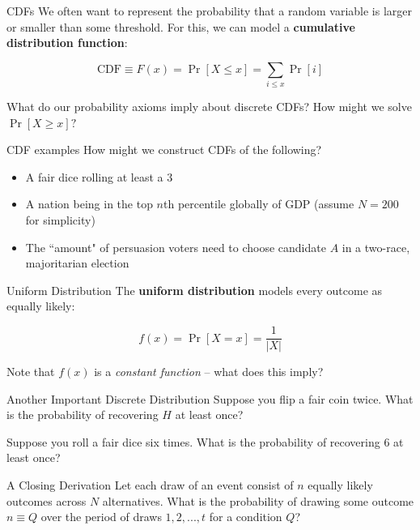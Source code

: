 \documentclass[10pt]{beamer}
\begin{document}
\begin{frame}{CDFs}
    We often want to represent the probability that a random variable is larger or smaller than some threshold. For this, we can model a \textbf{cumulative distribution function}:

    \[\text{CDF} \equiv F(x) = \Pr[X \leq x] = \sum_{i \leq x} \Pr[i]\]

    What do our probability axioms imply about discrete CDFs? How might we solve $\Pr[X \geq x]?$
\end{frame}

\begin{frame}{CDF examples}
    How might we construct CDFs of the following?

    \begin{itemize}
        \item A fair dice rolling at least a 3
        \item A nation being in the top $n$th percentile globally of GDP (assume $N = 200$ for simplicity)
        \item The ``amount" of persuasion voters need to choose candidate $A$ in a two-race, majoritarian election
        
    \end{itemize}
\end{frame}

\begin{frame}{Uniform Distribution}
    The \textbf{uniform distribution} models every outcome as equally likely:

    \[f(x) = \Pr[X = x] = \frac{1}{|X|} \]

    Note that $f(x)$ is a \textit{constant function} -- what does this imply?
\end{frame}

\begin{frame}{Another Important Discrete Distribution}
    Suppose you flip a fair coin twice. What is the probability of recovering $H$ at least once? \\

    \vspace{.5cm}

    Suppose you roll a fair dice six times. What is the probability of recovering $6$ at least once? \\

\end{frame}

\begin{frame}{A Closing Derivation}
    Let each draw of an event consist of $n$ equally likely outcomes across $N$ alternatives. What is the probability of drawing some outcome $n \equiv Q$ over the period of draws $1, 2, ...,t$ for a condition $Q$?
\end{frame}
\end{document}
